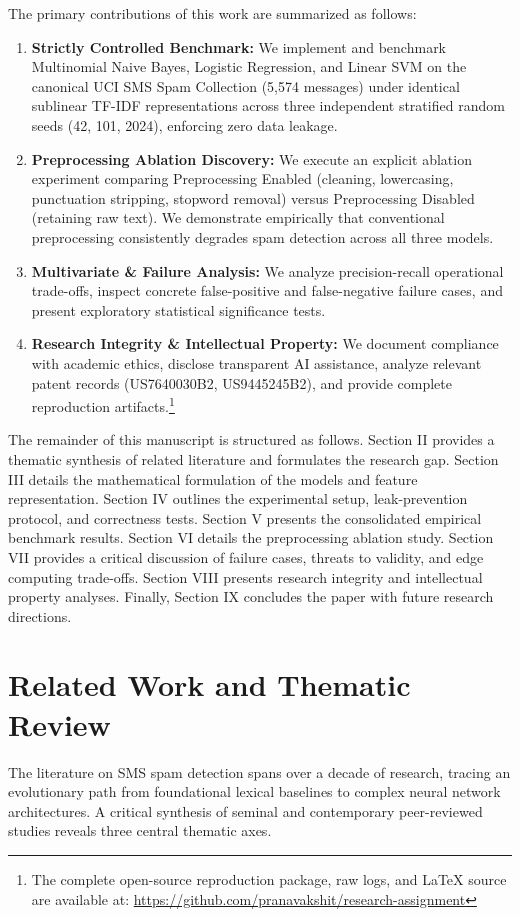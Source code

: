 \documentclass[conference]{IEEEtran}
\begin{document}
The primary contributions of this work are summarized as follows:
\begin{enumerate}
    \item \textbf{Strictly Controlled Benchmark:} We implement and benchmark Multinomial Naive Bayes, Logistic Regression, and Linear SVM on the canonical UCI SMS Spam Collection (5,574 messages) under identical sublinear TF-IDF representations across three independent stratified random seeds (42, 101, 2024), enforcing zero data leakage.
    \item \textbf{Preprocessing Ablation Discovery:} We execute an explicit ablation experiment comparing Preprocessing Enabled (cleaning, lowercasing, punctuation stripping, stopword removal) versus Preprocessing Disabled (retaining raw text). We demonstrate empirically that conventional preprocessing consistently degrades spam detection across all three models.
    \item \textbf{Multivariate \& Failure Analysis:} We analyze precision-recall operational trade-offs, inspect concrete false-positive and false-negative failure cases, and present exploratory statistical significance tests.
    \item \textbf{Research Integrity \& Intellectual Property:} We document compliance with academic ethics, disclose transparent AI assistance, analyze relevant patent records (US7640030B2, US9445245B2), and provide complete reproduction artifacts.\footnote{The complete open-source reproduction package, raw logs, and LaTeX source are available at: \url{https://github.com/pranavakshit/research-assignment}}
\end{enumerate}

The remainder of this manuscript is structured as follows. Section II provides a thematic synthesis of related literature and formulates the research gap. Section III details the mathematical formulation of the models and feature representation. Section IV outlines the experimental setup, leak-prevention protocol, and correctness tests. Section V presents the consolidated empirical benchmark results. Section VI details the preprocessing ablation study. Section VII provides a critical discussion of failure cases, threats to validity, and edge computing trade-offs. Section VIII presents research integrity and intellectual property analyses. Finally, Section IX concludes the paper with future research directions.

\section{Related Work and Thematic Review}
The literature on SMS spam detection spans over a decade of research, tracing an evolutionary path from foundational lexical baselines to complex neural network architectures. A critical synthesis of seminal and contemporary peer-reviewed studies reveals three central thematic axes.
\end{document}
